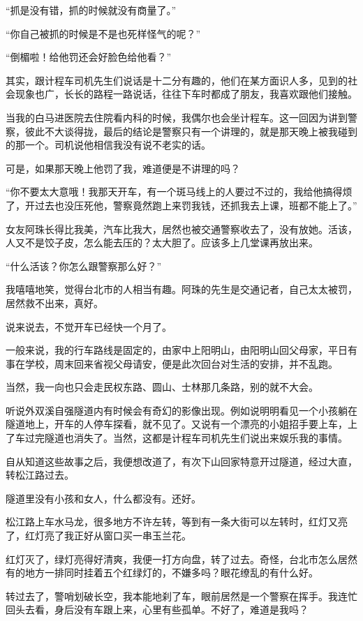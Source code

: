 \par “抓是没有错，抓的时候就没有商量了。”
\par “你自己被抓的时候是不是也死样怪气的呢？”
\par “倒楣啦！给他罚还会好脸色给他看？”
\par 其实，跟计程车司机先生们说话是十二分有趣的，他们在某方面识人多，见到的社会现象也广，长长的路程一路说话，往往下车时都成了朋友，我喜欢跟他们接触。
\par 当我的白马进医院去住院看内科的时候，我偶尔也会坐计程车。这一回因为讲到警察，彼此不大谈得拢，最后的结论是警察只有一个讲理的，就是那天晚上被我碰到的那一个。司机说他相信我没有说不老实的话。
\par 可是，如果那天晚上他罚了我，难道便是不讲理的吗？
\par “你不要太大意哦！我那天开车，有一个斑马线上的人要过不过的，我给他搞得烦了，开过去也没压死他，警察竟然跑上来罚我钱，还抓我去上课，班都不能上了。”
\par 女友阿珠长得比我美，汽车比我大，居然也被交通警察收去了，没有放她。活该，人又不是饺子皮，怎么能去压的？太大胆了。应该多上几堂课再放出来。
\par “什么活该？你怎么跟警察那么好？”
\par 我嘻嘻地笑，觉得台北市的人相当有趣。阿珠的先生是交通记者，自己太太被罚，居然救不出来，真好。
\par 说来说去，不觉开车已经快一个月了。
\par 一般来说，我的行车路线是固定的，由家中上阳明山，由阳明山回父母家，平日有事在学校，周末回来省视父母请安，便是此次回台对生活的安排，并不乱跑。
\par 当然，我一向也只会走民权东路、圆山、士林那几条路，别的就不大会。
\par 听说外双溪自强隧道内有时候会有奇幻的影像出现。例如说明明看见一个小孩躺在隧道地上，开车的人停车探看，就不见了。又说有一个漂亮的小姐招手要上车，上了车过完隧道也消失了。当然，这都是计程车司机先生们说出来娱乐我的事情。
\par 自从知道这些故事之后，我便想改道了，有次下山回家特意开过隧道，经过大直，转松江路过去。
\par 隧道里没有小孩和女人，什么都没有。还好。
\par 松江路上车水马龙，很多地方不许左转，等到有一条大街可以左转时，红灯又亮了，红灯亮了我正好从窗口买一串玉兰花。
\par 红灯灭了，绿灯亮得好清爽，我便一打方向盘，转了过去。奇怪，台北市怎么居然有的地方一排同时挂着五个红绿灯的，不嫌多吗？眼花缭乱的有什么好。
\par 转过去了，警哨划破长空，我本能地刹了车，眼前居然是一个警察在挥手。我连忙回头去看，身后没有车跟上来，心里有些孤单。不好了，难道是我吗？
